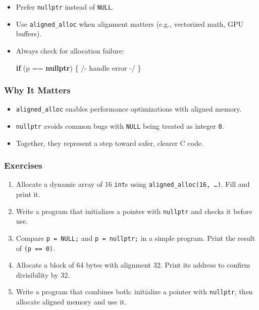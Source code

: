 \documentclass[
  letterpaper,
  DIV=11,
  numbers=noendperiod]{scrreprt}
\newenvironment{Shaded}{\begin{snugshade}}{\end{snugshade}}
\newcommand{\ControlFlowTok}[1]{\textcolor[rgb]{0.00,0.23,0.31}{\textbf{#1}}}
\newcommand{\KeywordTok}[1]{\textcolor[rgb]{0.00,0.23,0.31}{\textbf{#1}}}
\newcommand{\NormalTok}[1]{\textcolor[rgb]{0.00,0.23,0.31}{#1}}
\newcommand{\OperatorTok}[1]{\textcolor[rgb]{0.37,0.37,0.37}{#1}}
\providecommand{\tightlist}{%
  \setlength{\itemsep}{0pt}\setlength{\parskip}{0pt}}
\begin{document}
\begin{itemize}
\item
  Prefer \texttt{nullptr} instead of \texttt{NULL}.
\item
  Use \texttt{aligned\_alloc} when alignment matters (e.g., vectorized
  math, GPU buffers).
\item
  Always check for allocation failure:

\begin{Shaded}
\begin{Highlighting}[]
\ControlFlowTok{if} \OperatorTok{(}\NormalTok{p }\OperatorTok{==} \KeywordTok{nullptr}\OperatorTok{)} \OperatorTok{\{} \OperatorTok{/{-}}\NormalTok{ handle error }\OperatorTok{{-}/} \OperatorTok{\}}
\end{Highlighting}
\end{Shaded}
\end{itemize}

\subsubsection{Why It Matters}\label{why-it-matters-42}

\begin{itemize}
\tightlist
\item
  \texttt{aligned\_alloc} enables performance optimizations with aligned
  memory.
\item
  \texttt{nullptr} avoids common bugs with \texttt{NULL} being treated
  as integer \texttt{0}.
\item
  Together, they represent a step toward safer, clearer C code.
\end{itemize}

\subsubsection{Exercises}\label{exercises-43}

\begin{enumerate}
\def\labelenumi{\arabic{enumi}.}
\tightlist
\item
  Allocate a dynamic array of 16 \texttt{int}s using
  \texttt{aligned\_alloc(16,\ …)}. Fill and print it.
\item
  Write a program that initializes a pointer with \texttt{nullptr} and
  checks it before use.
\item
  Compare \texttt{p\ =\ NULL;} and \texttt{p\ =\ nullptr;} in a simple
  program. Print the result of \texttt{(p\ ==\ 0)}.
\item
  Allocate a block of 64 bytes with alignment 32. Print its address to
  confirm divisibility by 32.
\item
  Write a program that combines both: initialize a pointer with
  \texttt{nullptr}, then allocate aligned memory and use it.
\end{enumerate}
\end{document}
